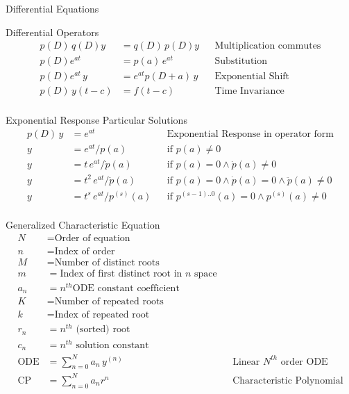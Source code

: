 \begin{section}{Differential Equations}
\begin{subsection}{Differential Operators}
\begin{align*}
      p(D)\,q(D)y &= q(D)\,p(D)y && \text{Multiplication commutes} \\
      p(D)e^{at} &= p(a)\,e^{at} && \text{Substitution} \\
      p(D)e^{at}\,y &= e^{at}p(D+a)\,y && \text{Exponential Shift} \\
      p(D)\,y(t-c) &= f(t-c) && \text{Time Invariance} \\
    \end{align*}
  \end{subsection}
  \begin{subsection}{Exponential Response}
     Particular Solutions
     \begin{align*}
       p(D)\,y &= e^{at} && \text{Exponential Response in operator form} \\
       y &= e^{at}/p(a) && \text{if $p(a) \ne 0$} \\
       y &= t\,e^{at}/\dot{p}(a) &&
           \text{if $p(a)=0 \land \dot{p}(a) \ne 0$} \\
       y &= t^{2}\,e^{at}/\ddot{p}(a) &&
           \text{if $p(a)=0 \land \dot{p}(a)=0 \land \ddot{p}(a) \ne 0$} \\
       y &= t^{s}\,e^{at}/p^{(s)}(a) &&
           \text{if $p^{(s-1)..0}(a)=0 \land p^{(s)}(a) \ne 0$} \\
     \end{align*}
  \end{subsection}
  \begin{subsection}{Generalized Characteristic Equation}
  \begin{align*}
    N &= \text{Order of equation}\\
    n &= \text{Index of order}\\
    M &= \text{Number of distinct roots}\\
    m &= \text{Index of first distinct root in $n$ space}\\
    a_n &= n^{th} \text{ODE constant coefficient}\\
    K &= \text{Number of repeated roots}\\
    k &= \text{Index of repeated root}\\
    r_n &= \text{$n^{th}$ (sorted) root}\\
    c_n &= \text{$n^{th}$ solution constant}\\
    \text{ODE} &= \sum_{n=0}^{N} a_n\,y^{(n)} && \text{Linear $N^{th}$ order ODE} \\
    \text{CP} &=\sum_{n=0}^{N} a_nr^n && \text{Characteristic Polynomial}\\

\end{align*}
\end{subsection}
\end{section}
